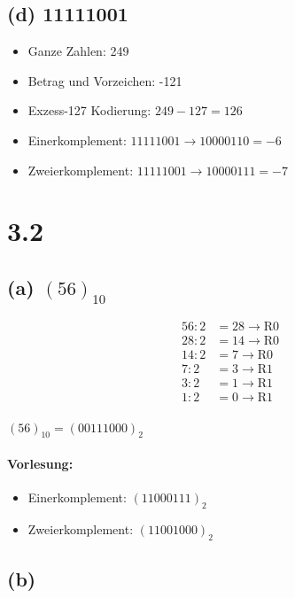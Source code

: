 \documentclass[11pt,a4paper]{article}
\begin{document}
\subsection*{(d) 11111001}
\begin{itemize}
  \item Ganze Zahlen: 249
  \item Betrag und Vorzeichen: -121
  \item Exzess-127 Kodierung: $249-127 = 126$
  \item Einerkomplement: $11111001 \rightarrow 10000110 = -6$
  \item Zweierkomplement: $11111001 \rightarrow 10000111 = -7$
 \end{itemize}


\section*{3.2} %
\label {sec:3.2}

\subsection*{(a) $(56)_{10}$}
\begin{align*}
    56:2 &= 28 \rightarrow \mbox{R}0 \\
    28:2 &= 14 \rightarrow \mbox{R}0 \\
    14:2 &= 7  \rightarrow \mbox{R}0 \\
    7:2 &= 3   \rightarrow \mbox{R}1 \\
    3:2 &= 1   \rightarrow \mbox{R}1 \\
    1:2 &= 0   \rightarrow \mbox{R}1 \\
\end{align*}

$(56)_{10}=(00111000)_2$

\paragraph{Vorlesung:}
\begin{itemize}
    \item Einerkomplement: $(11000111)_2$
    \item Zweierkomplement: $(11001000)_2$
\end{itemize}

\subsection*{(b)}
\end{document}
